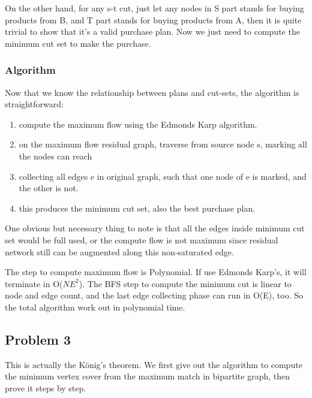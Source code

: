 \documentclass[paper=a4, fontsize=11pt]{scrartcl} %
\numberwithin{equation}{section} %
\numberwithin{figure}{section} %
\numberwithin{table}{section} %
\begin{document}
On the other hand, for any s-t cut, just let any nodes in S part stands for buying
products from B, and T part stands for buying products from A, then it is quite
trivial to show that it's a valid purchase plan. Now we just need to compute the minimum cut set to make the purchase. 

\subsubsection*{\textbf{Algorithm}}
Now that we know the relationship between plans and cut-sets, the algorithm is
straightforward:
\begin{enumerate}
\item compute the maximum flow using the Edmonds Karp algorithm.
\item on the maximum flow residual graph, traverse from source node s,
marking all the nodes can reach
\item collecting all edges e in original graph, such that one node of
e is marked, and the other is not.
\item this produces the minimum cut set, also the best purchase plan.
\end{enumerate}

One obvious but necessary thing to note is that all the edges inside minimum cut
set would be full used, or the compute flow is not maximum since residual network
still can be augmented along this non-saturated edge.

The step to compute maximum flow is Polynomial. If use Edmonds Karp's, it will
terminate in O($NE^2$). The BFS step to compute the minimum cut is linear to
node and edge count, and the last edge collecting phase can run in O(E), too.
So the total algorithm work out in polynomial time.

\subsection*{Problem 3}

This is actually the König's theorem. We first give out the algorithm to compute 
the minimum vertex cover from the maximum match in bipartite graph, then prove it
steps by step.
\end{document}
